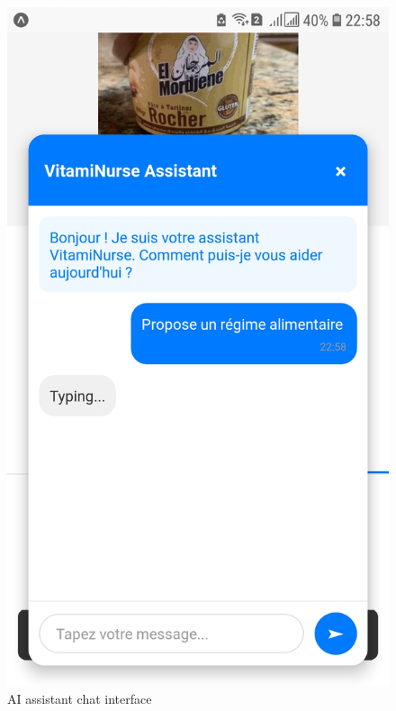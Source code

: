 \begin{center}
\begin{figure}[H]
\centering
\includegraphics[scale=0.11]{images/Screenshot_20250919-225837_chatbot.jpg}
\caption{AI assistant chat interface}
\label{fig:chat_interface}
\end{figure}
\end{center}

